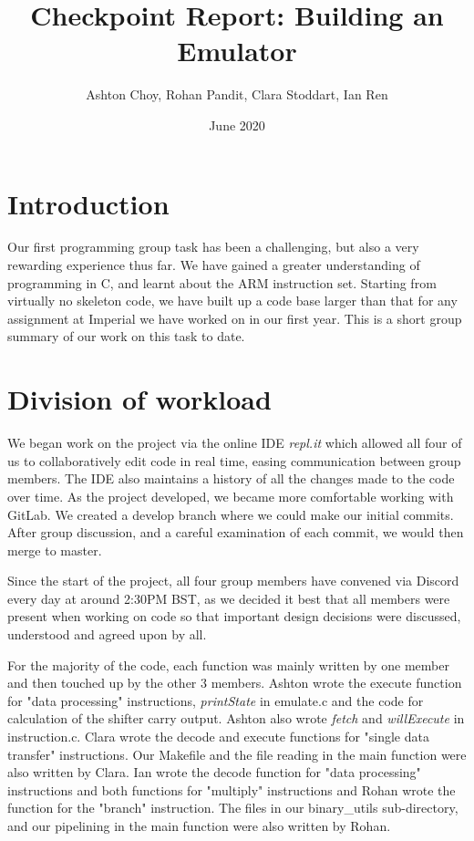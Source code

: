 \documentclass[11pt]{article}
\title{Checkpoint Report: Building an Emulator}
\author{Ashton Choy, Rohan Pandit, Clara Stoddart, Ian Ren }
\date{June 2020}
\begin{document}
\maketitle

\section*{Introduction}
Our first programming group task has been a challenging, but also a very rewarding experience thus far. We have gained a greater understanding of programming in C, and learnt about the ARM instruction set. Starting from virtually no skeleton code, we have built up a code base larger than that for any assignment at Imperial we have worked on in our first year. This is a short group summary of our work on this task to date.

\section{Division of workload}
We began work on the project via the online IDE \textit{repl.it} which allowed all four of us to collaboratively edit code in real time, easing communication between group members. The IDE also maintains a history of all the changes made to the code over time. As the project developed, we became more comfortable working with GitLab. We created a develop branch where we could make our initial commits. After group discussion, and a careful examination of each commit, we would then merge to master.

Since the start of the project, all four group members have convened via Discord every day at around 2:30PM BST, as we decided it best that all members were present when working on code so that important design decisions were discussed, understood and agreed upon by all.

For the majority of the code, each function was mainly written by one member and then touched up by the other 3 members. Ashton wrote the execute function for "data processing" instructions, \textit{printState} in emulate.c and the code for calculation of the shifter carry output. Ashton also wrote \textit{fetch} and \textit{willExecute} in instruction.c. Clara wrote the decode and execute functions for "single data transfer" instructions. Our Makefile and the file reading in the main function were also written by Clara. Ian wrote the decode function for "data processing" instructions and both functions for "multiply" instructions and Rohan wrote the function for the "branch" instruction. The files in our binary\_utils sub-directory, and our pipelining in the main function were also written by Rohan.
\end{document}
